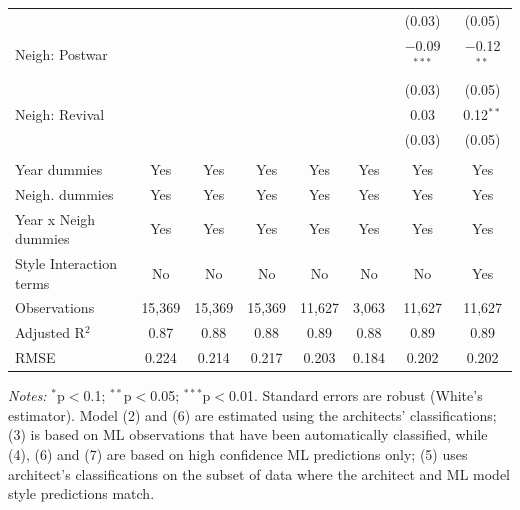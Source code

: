 \documentclass[]{article}
\begin{document}
\begin{table}[!htbp]
\begin{tabular}{@{\extracolsep{5pt}}lccccccc}
  &  &  &  &  &  & (0.03) & (0.05) \\ 
  Neigh: Postwar &  &  &  &  &  & $-$0.09$^{***}$ & $-$0.12$^{**}$ \\ 
  &  &  &  &  &  & (0.03) & (0.05) \\ 
  Neigh: Revival &  &  &  &  &  & 0.03 & 0.12$^{**}$ \\ 
  &  &  &  &  &  & (0.03) & (0.05) \\ 
 \hline \\[-1.8ex] 
Year dummies & Yes & Yes & Yes & Yes & Yes & Yes & Yes \\ 
Neigh. dummies & Yes & Yes & Yes & Yes & Yes & Yes & Yes \\ 
Year x Neigh dummies & Yes & Yes & Yes & Yes & Yes & Yes & Yes \\ 
Style Interaction terms & No & No & No & No & No & No & Yes \\ 
Observations & 15,369 & 15,369 & 15,369 & 11,627 & 3,063 & 11,627 & 11,627 \\ 
Adjusted R$^{2}$ & 0.87 & 0.88 & 0.88 & 0.89 & 0.88 & 0.89 & 0.89 \\ 
RMSE & 0.224 & 0.214 & 0.217 & 0.203 & 0.184 & 0.202 & 0.202 \\ 
\bottomrule
\end{tabular}
\begin{minipage}{\textwidth}
\vspace{0.25cm}
\footnotesize \emph{Notes:} $^{*}$p$<$0.1; $^{**}$p$<$0.05; $^{***}$p$<$0.01. Standard errors are robust (White's estimator). Model (2) and (6) are estimated using the architects' classifications; (3) is based on ML observations that have been automatically classified, while (4), (6) and (7) are based on high confidence ML predictions only; (5) uses architect's classifications on the subset of data where the architect and ML model style predictions match. 
\end{minipage}
\end{table}

\clearpage


\printbibliography[title=Bibliography]
\end{document}
